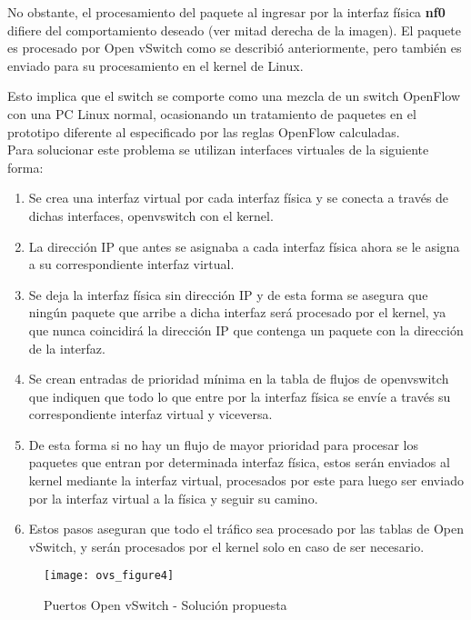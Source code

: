 \begin{enumerate}
No obstante, el procesamiento del paquete al ingresar por la interfaz f\'isica \textbf{nf0} difiere del comportamiento deseado (ver mitad derecha de la imagen). El paquete es procesado por Open vSwitch como se describi\'o anteriormente, pero tambi\'en es enviado para su procesamiento en el kernel de Linux.

Esto implica que el switch se comporte como una mezcla de un switch OpenFlow  con una PC Linux normal, ocasionando un tratamiento de paquetes en el prototipo diferente al especificado por las reglas OpenFlow calculadas.\\

Para solucionar este problema se utilizan interfaces virtuales de la siguiente forma:

\begin{enumerate}
\item Se crea una interfaz virtual por cada interfaz física y se conecta a través de dichas interfaces,  openvswitch con el kernel.

\item La dirección IP que antes se asignaba a cada interfaz física ahora se le asigna a su correspondiente interfaz virtual.

\item Se deja la interfaz física sin dirección IP y de esta forma se asegura que ningún paquete que arribe a dicha interfaz será procesado por el kernel, ya que nunca coincidirá la dirección IP que contenga un paquete con la dirección de la interfaz.

\item Se crean entradas de prioridad mínima en la tabla de flujos de openvswitch que indiquen que todo lo que entre por la interfaz física se envíe a través su correspondiente interfaz virtual y viceversa.

\item De esta forma si no hay un flujo de mayor prioridad para procesar los paquetes que entran por determinada interfaz física, estos serán enviados al kernel mediante la interfaz virtual, procesados por este para luego ser enviado por la interfaz virtual a la física y seguir su camino.

\item Estos pasos aseguran que todo el tráfico sea procesado por las tablas de Open vSwitch, y serán procesados por el kernel solo en caso de ser necesario.
\end{enumerate}

\begin{figure}[h!] 
\centering    
\texttt{[image: ovs\_figure4]}
\caption[Puertos Open vSwitch - Soluci\'on propuesta]{Puertos Open vSwitch - Soluci\'on propuesta}
\label{fig:OVSInterfaces2}
\end{figure}

\end{enumerate}

